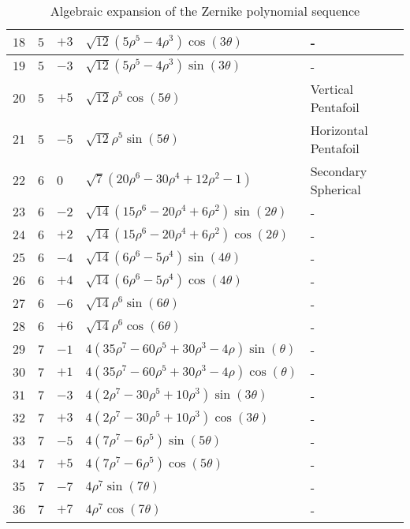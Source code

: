 \begin{table}
\begin{tabular}{ | p{2cm} | p{1.5cm} | p{2cm} | p{6.25cm} | p{4cm} |}
		$18$ & $5$ & $+3$ & $\sqrt{12}\left(5\rho^{5} - 4\rho^{3}\right) \cos(3\theta)$ & - \\ \hline
		$19$ & $5$ & $-3$ & $\sqrt{12}\left(5\rho^{5} - 4\rho^{3}\right) \sin(3\theta)$ & - \\ \hline
		$20$ & $5$ & $+5$ & $\sqrt{12}\rho^{5} \cos(5\theta)$ & Vertical Pentafoil \\ \hline
		$21$ & $5$ & $-5$ & $\sqrt{12}\rho^{5} \sin(5\theta)$ & Horizontal Pentafoil \\ \hline
		$22$ & $6$ & $0$ & $\sqrt{7}\left(20\rho^{6} - 30\rho^{4} + 12\rho^{2} - 1\right)$ & Secondary Spherical \\ \hline
		$23$ & $6$ & $-2$ & $\sqrt{14}\left(15\rho^{6} - 20\rho^{4} + 6\rho^{2}\right)\sin(2\theta)$ & - \\ \hline
		$24$ & $6$ & $+2$ & $\sqrt{14}\left(15\rho^{6} - 20\rho^{4} + 6\rho^{2}\right)\cos(2\theta)$ & - \\ \hline
		$25$ & $6$ & $-4$ & $\sqrt{14}\left(6\rho^{6} - 5\rho^{4}\right)\sin(4\theta)$ & - \\ \hline
		$26$ & $6$ & $+4$ & $\sqrt{14}\left(6\rho^{6} - 5\rho^{4}\right)\cos(4\theta)$ & - \\ \hline
		$27$ & $6$ & $-6$ & $\sqrt{14}\rho^{6}\sin(6\theta)$ & - \\ \hline
		$28$ & $6$ & $+6$ & $\sqrt{14}\rho^{6}\cos(6\theta)$ & - \\ \hline
		$29$ & $7$ & $-1$ & $4\left(35\rho^{7} - 60\rho^{5} + 30\rho^{3} - 4\rho\right) \sin(\theta)$ & - \\ \hline
		$30$ & $7$ & $+1$ & $4\left(35\rho^{7} - 60\rho^{5} + 30\rho^{3} - 4\rho\right) \cos(\theta)$ & - \\ \hline
		$31$ & $7$ & $-3$ & $4\left(2\rho^{7} - 30\rho^{5} + 10\rho^{3}\right) \sin(3\theta)$ & - \\ \hline
		$32$ & $7$ & $+3$ & $4\left(2\rho^{7} - 30\rho^{5} + 10\rho^{3}\right) \cos(3\theta)$ & - \\ \hline
		$33$ & $7$ & $-5$ & $4\left(7\rho^{7} - 6\rho^{5}\right) \sin(5\theta)$ & - \\ \hline
		$34$ & $7$ & $+5$ & $4\left(7\rho^{7} - 6\rho^{5}\right) \cos(5\theta)$ & - \\ \hline
		$35$ & $7$ & $-7$ & $4\rho^{7} \sin(7\theta)$ & - \\ \hline
		$36$ & $7$ & $+7$ & $4\rho^{7} \cos(7\theta)$ & - \\ \hline
	\end{tabular}
	\caption{\label{tab:zernike_expansion}Algebraic expansion of the Zernike polynomial sequence}
\end{table}